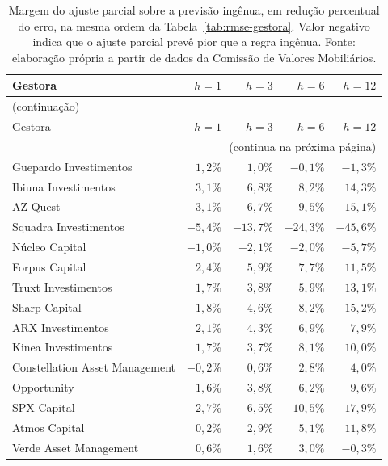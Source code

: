 \documentclass[12pt,a4paper]{article}
\begin{document}
\begin{center}\scriptsize
\begin{longtable}{@{}lrrrr@{}}
\caption{Margem do ajuste parcial sobre a previsão ingênua, em redução percentual do erro,
na mesma ordem da Tabela~\ref{tab:rmse-gestora}. Valor negativo indica que o ajuste parcial
prevê pior que a regra ingênua. Fonte: elaboração própria a partir de dados da Comissão de
Valores Mobiliários.}
\label{tab:margem-gestora}\\
\toprule
Gestora & $h{=}1$ & $h{=}3$ & $h{=}6$ & $h{=}12$ \\
\midrule
\endfirsthead
\multicolumn{5}{l}{(continuação)}\\
\toprule
Gestora & $h{=}1$ & $h{=}3$ & $h{=}6$ & $h{=}12$ \\
\midrule
\endhead
\midrule
\multicolumn{5}{r}{(continua na próxima página)}\\
\endfoot
\bottomrule
\endlastfoot
Guepardo Investimentos & $1{,}2\%$ & $1{,}0\%$ & $-0{,}1\%$ & $-1{,}3\%$ \\
Ibiuna Investimentos & $3{,}1\%$ & $6{,}8\%$ & $8{,}2\%$ & $14{,}3\%$ \\
AZ Quest & $3{,}1\%$ & $6{,}7\%$ & $9{,}5\%$ & $15{,}1\%$ \\
Squadra Investimentos & $-5{,}4\%$ & $-13{,}7\%$ & $-24{,}3\%$ & $-45{,}6\%$ \\
Núcleo Capital & $-1{,}0\%$ & $-2{,}1\%$ & $-2{,}0\%$ & $-5{,}7\%$ \\
Forpus Capital & $2{,}4\%$ & $5{,}9\%$ & $7{,}7\%$ & $11{,}5\%$ \\
Truxt Investimentos & $1{,}7\%$ & $3{,}8\%$ & $5{,}9\%$ & $13{,}1\%$ \\
Sharp Capital & $1{,}8\%$ & $4{,}6\%$ & $8{,}2\%$ & $15{,}2\%$ \\
ARX Investimentos & $2{,}1\%$ & $4{,}3\%$ & $6{,}9\%$ & $7{,}9\%$ \\
Kinea Investimentos & $1{,}7\%$ & $3{,}7\%$ & $8{,}1\%$ & $10{,}0\%$ \\
Constellation Asset Management & $-0{,}2\%$ & $0{,}6\%$ & $2{,}8\%$ & $4{,}0\%$ \\
Opportunity & $1{,}6\%$ & $3{,}8\%$ & $6{,}2\%$ & $9{,}6\%$ \\
SPX Capital & $2{,}7\%$ & $6{,}5\%$ & $10{,}5\%$ & $17{,}9\%$ \\
Atmos Capital & $0{,}2\%$ & $2{,}9\%$ & $5{,}1\%$ & $11{,}8\%$ \\
Verde Asset Management & $0{,}6\%$ & $1{,}6\%$ & $3{,}0\%$ & $-0{,}3\%$ \\

\end{longtable}
\end{center}
\end{document}
